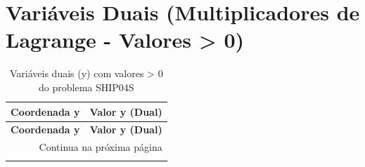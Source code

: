 \documentclass[12pt]{article}
\begin{document}
\section{Variáveis Duais (Multiplicadores de Lagrange - Valores > 0)}

\begin{longtable}{@{}cc@{}}
\caption{Variáveis duais (y) com valores > 0 do problema SHIP04S} \\
\toprule
\textbf{Coordenada y} & \textbf{Valor y (Dual)} \\
\midrule
\endfirsthead

\toprule
\textbf{Coordenada y} & \textbf{Valor y (Dual)} \\
\midrule
\endhead

\midrule \multicolumn{2}{r}{{Continua na próxima página}} \\ \midrule
\endfoot


\end{longtable}
\end{document}
